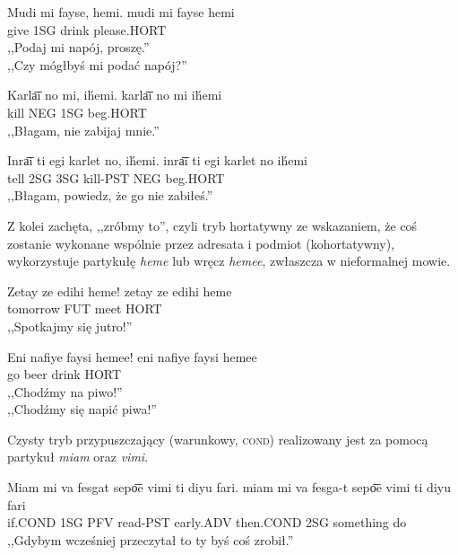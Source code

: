 \begin{spacing}{1.1}
\begin{exe}
	\ex
	\trans Mudi mi fayse, hemi.
	\gll  mudi mi fayse hemi\\
	  give 1SG drink please.HORT\\
	\glt  ,,Podaj mi napój, proszę.'' \\ ,,Czy mógłbyś mi podać napój?''
\end{exe}

\begin{exe}
	\ex
	\trans Karla͞i no mi, ih́emi.
	\gll  karla͞i no mi ih́emi\\
	  kill NEG 1SG beg.HORT\\
	\glt ,,Błagam, nie zabijaj mnie.''
\end{exe}

\begin{exe}
	\ex
	\trans Inra͞i ti egi karlet no, ih́emi.
	\gll  inra͞i ti egi karlet no ih́emi\\
	  tell 2SG 3SG kill-PST NEG beg.HORT\\
	\glt ,,Błagam, powiedz, że go nie zabiłeś.''
\end{exe}

Z kolei zachęta, ,,zróbmy to'', czyli tryb hortatywny ze wskazaniem, że coś
zostanie wykonane wspólnie przez adresata i podmiot (kohortatywny), wykorzystuje
partykułę \emph{heme} lub wręcz \emph{hemee}, zwłaszcza w nieformalnej mowie.

\begin{exe}
	\ex
	\trans Zetay ze edihi heme!
	\gll  zetay ze edihi heme\\
	  tomorrow FUT meet HORT \\
	\glt  ,,Spotkajmy się jutro!''
\end{exe}

\begin{exe}
	\ex
	\trans Eni nafiye faysi hemee!
	\gll eni nafiye faysi hemee\\
	  go beer drink HORT \\
	\glt  ,,Chodźmy na piwo!'' \\ ,,Chodźmy się napić piwa!''
\end{exe}

Czysty tryb przypuszczający (warunkowy, \textsc{cond}) realizowany jest za
pomocą partykuł \emph{miam} oraz \emph{vimi}.

\begin{exe}
	\ex
	\trans Miam mi va fesgat sepo͞e vimi ti diyu fari.
	\gll miam mi va fesga-t sepo͞e vimi ti diyu fari\\
	  if.COND 1SG PFV read-PST early.ADV then.COND 2SG something do \\
	\glt  ,,Gdybym wcześniej przeczytał to ty byś coś zrobił.''
\end{exe}


\end{spacing}
